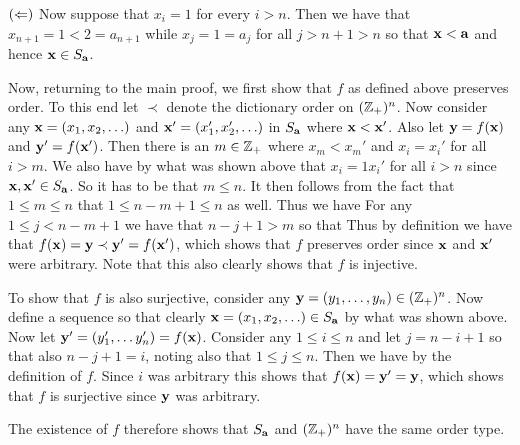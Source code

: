 {{    $(\Leftarrow)$ Now suppose that $x_i = 1$ for every $i > n$.
    Then we have that $x_{n+1} = 1 < 2 = a_{n+1}$ while $x_j = 1 = a_j$ for all $j > n+1 > n$ so that $\mathbf{x} < \mathbf{a}$ and hence $\mathbf{x} \in S_{\mathbf{a}}$.

    Now, returning to the main proof, we first show that $f$ as defined above preserves order.
    To this end let $\prec$ denote the dictionary order on $({{\mathbb{Z}}_+})^n$.
    Now consider any $\mathbf{x} = (x_1, x_2, \ldots)$ and $\mathbf{x}' = (x_1', x_2', \ldots)$ in $S_{\mathbf{a}}$ where $\mathbf{x} < \mathbf{x}'$.
    Also let $\mathbf{y} = f(\mathbf{x})$ and $\mathbf{y}' = f(\mathbf{x}')$.
    Then there is an $m \in {{\mathbb{Z}}_+}$ where $x_m < x_m'$ and $x_i = x_i'$ for all $i > m$.
    We also have by what was shown above that $x_i = 1 x_i'$ for all $i > n$ since $\mathbf{x},\mathbf{x}' \in S_{\mathbf{a}}$.
    So it has to be that $m \leq n$.
    It then follows from the fact that $1 \leq m \leq n$ that $1 \leq n-m+1 \leq n$ as well.
    Thus we have
    For any $1 \leq j < n-m+1$ we have that $n-j+1 > m$ so that
    Thus by definition we have that $f(\mathbf{x}) = \mathbf{y} \prec \mathbf{y}' = f(\mathbf{x}')$, which shows that $f$ preserves order since $\mathbf{x}$ and $\mathbf{x}'$ were arbitrary.
    Note that this also clearly shows that $f$ is injective.

    To show that $f$ is also surjective, consider any $\mathbf{y} = (y_1, \ldots, y_n) \in ({{\mathbb{Z}}_+})^n$.
    Now define a sequence
    so that clearly $\mathbf{x} = (x_1, x_2, \ldots) \in S_{\mathbf{a}}$ by what was shown above.
    Now let $\mathbf{y}' = (y_1', \ldots y_n') = f(\mathbf{x})$.
    Consider any $1 \leq i \leq n$ and let $j = n-i+1$ so that also $n-j+1 = i$, noting also that $1 \leq j \leq n$.
    Then we have
    by the definition of $f$.
    Since $i$ was arbitrary this shows that $f(\mathbf{x}) = \mathbf{y}' = \mathbf{y}$, which shows that $f$ is surjective since $\mathbf{y}$ was arbitrary.

    The existence of $f$ therefore shows that $S_{\mathbf{a}}$ and $({{\mathbb{Z}}_+})^n$ have the same order type.
  }

}
